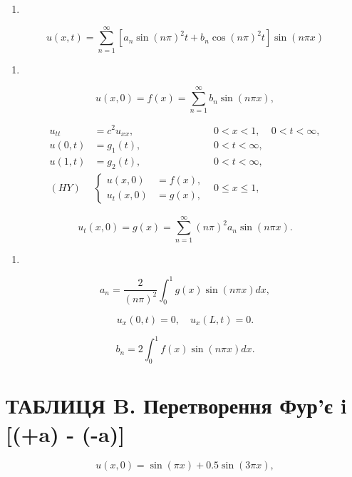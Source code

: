 \documentclass[
  ukrainian,
]{article}
\providecommand{\tightlist}{%
  \setlength{\itemsep}{0pt}\setlength{\parskip}{0pt}}
\begin{document}
\begin{enumerate}
\def\labelenumi{\arabic{enumi}.}
\setcounter{enumi}{16}
\tightlist
\item
\end{enumerate}

\[
u(x, t) = \sum_{n=1}^{\infty} \left[ a_n \sin(n\pi)^2 t + b_n \cos(n\pi)^2 t \right] \sin(n\pi x)
\]

\begin{enumerate}
\def\labelenumi{\arabic{enumi}.}
\setcounter{enumi}{17}
\tightlist
\item
\end{enumerate}

\[
u(x, 0) = f(x) = \sum_{n=1}^{\infty} b_n \sin(n\pi x),
\]

\[
\begin{aligned} u_{tt} &= c^2 u_{xx}, & 0 < x < 1, & 0 < t < \infty, \\ u(0, t) &= g_1(t), & 0 < t < \infty, \\ u(1, t) &= g_2(t), & 0 < t < \infty, \\ (HY) &\begin{cases} u(x, 0) &= f(x), \\ u_t(x, 0) &= g(x), \end{cases} & 0 \leqslant x \leqslant 1, \end{aligned}
\]

\[
u_t(x, 0) = g(x) = \sum_{n=1}^{\infty} (n\pi)^2 a_n \sin(n\pi x).
\]

\begin{enumerate}
\def\labelenumi{\arabic{enumi}.}
\setcounter{enumi}{9}
\tightlist
\item
\end{enumerate}

\[
a_n = \frac{2}{(n\pi)^2} \int_0^1 g(x) \sin(n\pi x) dx,
\]

\[
u_x(0, t) = 0, \quad u_x(L, t) = 0.
\]

\[
b_n = 2 \int_0^1 f(x) \sin(n\pi x) dx.
\]

\section{\texorpdfstring{ТАБЛИЦЯ B. Перетворення Фур'є i
 {[}\delta(\omega+a) -
\delta(\omega-a){]}}{ТАБЛИЦЯ B. Перетворення Фур'є i  {[}(+a) - (-a){]}}}\label{ux442ux430ux431ux43bux438ux446ux44f-b.-ux43fux435ux440ux435ux442ux432ux43eux440ux435ux43dux43dux44f-ux444ux443ux440ux454-i-a----a}

\[
u(x, 0) = \sin(\pi x) + 0.5 \sin(3\pi x),
\]
\end{document}
